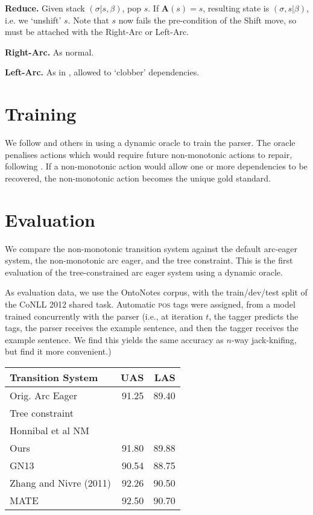 \documentclass[11pt,letterpaper]{article}
\begin{document}
\textbf{Reduce.} Given stack $(\sigma | s, \beta)$, pop $s$. If $\mathbf{A}(s)=s$, 
resulting state is $(\sigma, s | \beta)$, i.e. we `unshift' $s$.  Note that $s$
now fails the pre-condition of the Shift move, so must be attached with the
Right-Arc or Left-Arc.

\textbf{Right-Arc.} As normal.

\textbf{Left-Arc.} As in \citet{honnibal:13}, allowed to `clobber' dependencies.

\section{Training}

We follow \citet{goldberg:12} and others in using a dynamic oracle to train
the parser.  The oracle penalises actions which would require future non-monotonic
actions to repair, following \citet{honnibal:13}.  If a non-monotonic action would
allow one or more dependencies to be recovered, the non-monotonic action becomes
the unique gold standard.


\section{Evaluation}

We compare the non-monotonic transition system against the default arc-eager
system, the \citet{honnibal:13} non-monotonic arc eager, and the \citet{nivre:14}
tree constraint. This is the first evaluation of the tree-constrained arc eager
system using a dynamic oracle.

As evaluation data, we use the OntoNotes corpus, with the train/dev/test split
of the CoNLL 2012 shared task.  Automatic \textsc{pos} tags were assigned, from
a model trained concurrently with the parser (i.e., at iteration $t$, the tagger
predicts the tags, the parser receives the example sentence, and then the tagger
receives the example sentence. We find this yields the same accuracy as $n$-way
jack-knifing, but find it more convenient.)

\begin{table}
    \begin{tabular}{l|rr}
    \hline
    Transition System  & UAS & LAS    \\
        \hline \hline
Orig. Arc Eager        & 91.25 & 89.40  \\
Tree constraint        &       &       \\
Honnibal et al NM      &       &       \\
Ours                   & 91.80 & 89.88 \\
\hline
GN13                   & 90.54 & 88.75 \\
Zhang and Nivre (2011) & 92.26 & 90.50 \\
MATE                   & 92.50 & 90.70 \\
\hline
\end{tabular}
\end{table}



\end{document}
